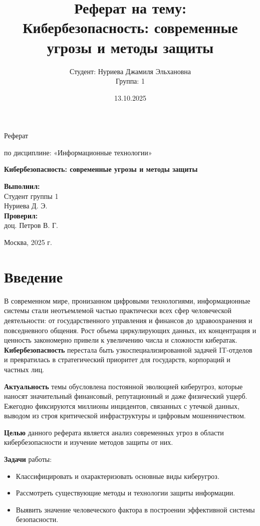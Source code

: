 \documentclass[14pt]{extreport}
\title{Реферат на тему: \\[0.5cm] \textbf{Кибербезопасность: современные угрозы и методы защиты}}
\author{Студент: Нуриева Джамиля Эльхановна \\ Группа: 1}
\date{13.10.2025}
\begin{document}
\begin{titlepage}
    \centering
    {\large Реферат \par}
    \vspace{1cm}
    {\large по дисциплине: «Информационные технологии» \par}
    \vspace{1cm}
    {\Large \textbf{Кибербезопасность: современные угрозы и методы защиты} \par}
    \vfill
    \begin{flushright}
        \textbf{Выполнил:} \\
        Студент группы 1 \\
        Нуриева Д. Э. \\
        \vspace{1cm}
        \textbf{Проверил:} \\
        доц. Петров В. Г.
    \end{flushright}
    \vfill
    {\large Москва, 2025 г. \par}
\end{titlepage}

\tableofcontents

\chapter{Введение}
\label{chap:intro}

В современном мире, пронизанном цифровыми технологиями, информационные системы стали неотъемлемой частью практически всех сфер человеческой деятельности: от государственного управления и финансов до здравоохранения и повседневного общения. Рост объема циркулирующих данных, их концентрация и ценность закономерно привели к увеличению числа и сложности кибератак. \textbf{Кибербезопасность} перестала быть узкоспециализированной задачей IT-отделов и превратилась в стратегический приоритет для государств, корпораций и частных лиц.

\textbf{Актуальность} темы обусловлена постоянной эволюцией киберугроз, которые наносят значительный финансовый, репутационный и даже физический ущерб. Ежегодно фиксируются миллионы инцидентов, связанных с утечкой данных, выводом из строя критической инфраструктуры и цифровым мошенничеством.

\textbf{Целью} данного реферата является анализ современных угроз в области кибербезопасности и изучение методов защиты от них.

\textbf{Задачи} работы:
\begin{itemize}
    \item Классифицировать и охарактеризовать основные виды киберугроз.
    \item Рассмотреть существующие методы и технологии защиты информации.
    \item Выявить значение человеческого фактора в построении эффективной системы безопасности.
\end{itemize}
\end{document}
